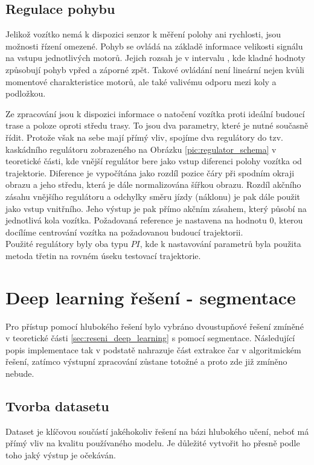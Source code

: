 \documentclass[czech, bc, kky, he, iso690numb]{fasthesis}
\begin{document}
            \subsection{Regulace pohybu}
                Jelikož vozítko nemá k dispozici senzor k měření polohy ani rychlosti, jsou možnosti řízení omezené. Pohyb se ovládá na základě informace velikosti signálu na vstupu jednotlivých motorů. Jejich rozsah je v intervalu \(<-1,1>\), kde kladné hodnoty způsobují pohyb vpřed a záporné zpět. Takové ovládání není lineární nejen kvůli momentové charakteristice motorů, ale také valivému odporu mezi koly a podložkou.
                
                Ze zpracování jsou k dispozici informace o natočení vozítka proti ideální budoucí trase a poloze oproti středu trasy. To jsou dva parametry, které je nutné současně řídit. Protože však na sebe mají přímý vliv, spojíme dva regulátory do tzv. kaskádního regulátoru zobrazeného na Obrázku \ref{pic:regulator_schema} v teoretické části, kde vnější regulátor bere jako vstup diferenci polohy vozítka od trajektorie. Diference je vypočítána jako rozdíl pozice čáry při spodním okraji obrazu a jeho středu, která je dále normalizována šířkou obrazu. Rozdíl akčního zásahu vnějšího regulátoru a odchylky směru jízdy (náklonu) je pak dále použit jako vstup vnitřního. Jeho výstup je pak přímo akčním zásahem, který působí na jednotlivá kola vozítka. Požadovaná reference je nastavena na hodnotu \(0\), kterou docílíme centrování vozítka na požadovanou budoucí trajektorii.\\
                Použité regulátory byly oba typu \(PI\), kde k nastavování parametrů byla použita metoda třetin na rovném úseku testovací trajektorie.
                
        \newpage
        \section{Deep learning řešení - segmentace}
        	Pro přístup pomocí hlubokého řešení bylo vybráno dvoustupňové řešení zmíněné v teoretické části \ref{sec:reseni_deep_learning} s pomocí segmentace. Následující popis implementace tak v podstatě nahrazuje část extrakce čar v algoritmickém řešení, zatímco výstupní zpracování zůstane totožné a proto zde již zmíněno nebude.
        	
        	\subsection{Tvorba datasetu}
        		Dataset je klíčovou součástí jakéhokoliv řešení na bázi hlubokého učení, neboť má přímý vliv na kvalitu používaného modelu. Je důležité vytvořit ho přesně podle toho jaký výstup je očekáván.
        		
\end{document}
